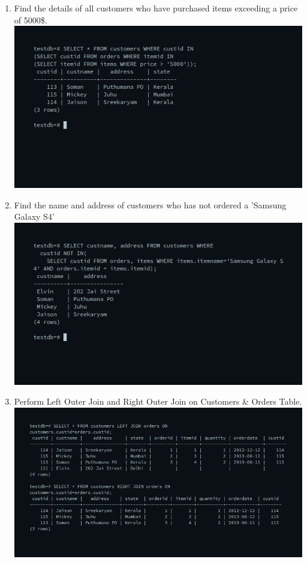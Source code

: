 \documentclass[10pt,a4paper,titlepage]{report}
\begin{document}
{\begin{enumerate}
	\item Find the details of all customers who have purchased items exceeding a price of 5000\$.\newline
	\includegraphics[width=\linewidth]{../Images/Joins/10.png}
	\item Find the name and address of customers who has not ordered a 'Samsung Galaxy S4'\newline
	\includegraphics[width=\linewidth]{../Images/Joins/11.png}
	\item Perform Left Outer Join and Right Outer Join on Customers & Orders Table.\newline
	\includegraphics[width=\linewidth]{../Images/Joins/12.png}

\end{enumerate}}
\end{document}
